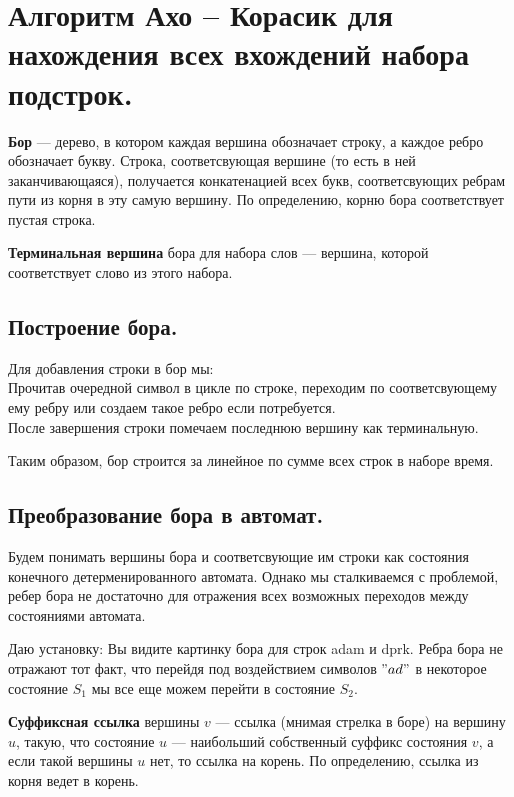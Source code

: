 \section{Алгоритм Ахо -- Корасик для нахождения всех вхождений набора подстрок.}%

\begin{Def}
	\textbf{Бор} --- дерево, в котором каждая вершина обозначает строку, а каждое ребро обозначает букву. Строка, соответсвующая вершине (то есть в ней заканчивающаяся), получается конкатенацией всех букв, соответсвующих ребрам пути из корня в эту самую вершину. По определению, корню бора соответствует пустая строка.
\end{Def}

\begin{Def}
	\textbf{Терминальная вершина} бора для набора слов --- вершина, которой соответствует слово из этого набора.
\end{Def}

\subsection{Построение бора.}%
\label{ssub:Построение бора.}

Для добавления строки в бор мы: \\
Прочитав очередной символ в цикле по строке, переходим по соответсвующему ему ребру или создаем такое ребро если потребуется. \\
После завершения строки помечаем последнюю вершину как терминальную.

Таким образом, бор строится за линейное по сумме всех строк в наборе время.

\subsection{Преобразование бора в автомат.}%
Будем понимать вершины бора и соответсвующие им строки как состояния конечного детерменированного автомата. Однако мы сталкиваемся с проблемой, ребер бора не достаточно для отражения всех возможных переходов между состояниями автомата. 
\begin{example}
	Даю установку: Вы видите картинку бора для строк adam и dprk.
	Ребра бора не отражают тот факт, что перейдя под воздействием символов $"ad"$ в некоторое состояние  $S_1$ мы все еще можем перейти в состояние  $S_2$.
\end{example}

\begin{Def}
	\textbf{Суффиксная ссылка} вершины $v$ --- ссылка (мнимая стрелка в боре) на вершину $u$, такую, что состояние $u$ --- наибольший собственный суффикс состояния $v$, а если такой вершины  $u$ нет, то ссылка на корень. По определению, ссылка из корня ведет в корень.
\end{Def}

